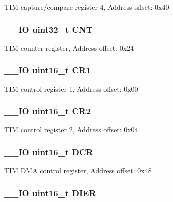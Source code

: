 T\-I\-M capture/compare register 4, Address offset\-: 0x40 \hypertarget{struct_t_i_m___type_def_a6095a27d764d06750fc0d642e08f8b2a}{
\subsubsection[{C\-N\-T}]{\setlength{\rightskip}{0pt plus 5cm}\-\_\-\-\_\-\-I\-O uint32\-\_\-t C\-N\-T}}\label{struct_t_i_m___type_def_a6095a27d764d06750fc0d642e08f8b2a}
T\-I\-M counter register, Address offset\-: 0x24 \hypertarget{struct_t_i_m___type_def_a61400ce239355b62aa25c95fcc18a5e1}{
\subsubsection[{C\-R1}]{\setlength{\rightskip}{0pt plus 5cm}\-\_\-\-\_\-\-I\-O uint16\-\_\-t C\-R1}}\label{struct_t_i_m___type_def_a61400ce239355b62aa25c95fcc18a5e1}
T\-I\-M control register 1, Address offset\-: 0x00 \hypertarget{struct_t_i_m___type_def_a2a3e81bd118d1bc52d24a0b0772e6a0c}{
\subsubsection[{C\-R2}]{\setlength{\rightskip}{0pt plus 5cm}\-\_\-\-\_\-\-I\-O uint16\-\_\-t C\-R2}}\label{struct_t_i_m___type_def_a2a3e81bd118d1bc52d24a0b0772e6a0c}
T\-I\-M control register 2, Address offset\-: 0x04 \hypertarget{struct_t_i_m___type_def_a0afd527a4ec64faf878f9957096102bf}{
\subsubsection[{D\-C\-R}]{\setlength{\rightskip}{0pt plus 5cm}\-\_\-\-\_\-\-I\-O uint16\-\_\-t D\-C\-R}}\label{struct_t_i_m___type_def_a0afd527a4ec64faf878f9957096102bf}
T\-I\-M D\-M\-A control register, Address offset\-: 0x48 \hypertarget{struct_t_i_m___type_def_a1481b34cc41018c17e4ab592a1c8cb55}{
\subsubsection[{D\-I\-E\-R}]{\setlength{\rightskip}{0pt plus 5cm}\-\_\-\-\_\-\-I\-O uint16\-\_\-t D\-I\-E\-R}}\label{struct_t_i_m___type_def_a1481b34cc41018c17e4ab592a1c8cb55}
